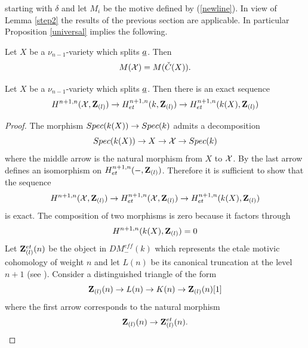 \documentclass[11pt]{article}
\begin{document}
starting with $\delta$ and let $M_i$ be the motive defined
by (\ref{newline}). In view of Lemma \ref{step2} the results of
the previous section are applicable. In particular Proposition
\ref{universal} implies the following.
%
\begin{lemma}
Let $X$ be a $\nu_{n-1}$-variety which splits $\underline{a}$. Then 
%
$$M({\cal X})=M(\check{C}(X)).$$
\end{lemma}
%
\begin{lemma}
 Let $X$ be a $\nu_{n-1}$-variety which splits
$\underline{a}$. Then there is an exact sequence
%
$$H^{n+1,n}({\cal X},{\bf Z\rm}_{(l)})\rightarrow H^{n+1,n}_{et}(k,{\bf Z\rm}_{(l)})\rightarrow
H^{n+1,n}_{et}(k(X),{\bf Z\rm}_{(l)})$$
%
\end{lemma}
%
\begin{proof}
The morphism $Spec(k(X))\rightarrow Spec(k)$ admits a decomposition
%
$$Spec(k(X))\rightarrow X\rightarrow {\cal X}\rightarrow Spec(k)$$
%
where the middle arrow is the natural morphism from $X$ to
$\cal X$. By \cite[Lemma 7.3]{MCpub} the last arrow defines an isomorphism on
$H^{n+1,n}_{et}(-,{\bf Z\rm}_{(l)})$. Therefore it is sufficient to show that
the sequence
%
$$H^{n+1,n}({\cal X},{\bf Z\rm}_{(l)})\rightarrow H^{n+1,n}_{et}({\cal X},{\bf Z\rm}_{(l)})\rightarrow
H^{n+1,n}_{et}(k(X),{\bf Z\rm}_{(l)})$$
%
is exact. The composition of two morphisms is zero because it factors
through 
%
$$H^{n+1,n}(k(X),{\bf Z\rm}_{(l)})=0$$
%
Let ${\bf Z\rm}_{(l)}^{et}(n)$ be the object in $DM^{eff}_{-}(k)$ which
represents the etale motivic cohomology of weight $n$ and let $L(n)$
be its canonical truncation at the level $n+1$ (see
\cite[p.90]{MCpub}). Consider a distinguished triangle of the form
%
$${\bf Z\rm}_{(l)}(n)\rightarrow L(n)\rightarrow K(n)\rightarrow
{\bf Z\rm}_{(l)}(n)[1]$$
%
where the first arrow corresponds to the natural morphism
%
$${\bf Z\rm}_{(l)}(n)\rightarrow {\bf Z\rm}_{(l)}^{et}(n).$$
%




\end{proof}
\end{document}
